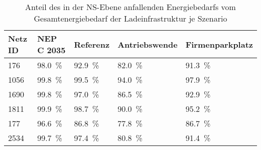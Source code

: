 {
\renewcommand{\arraystretch}{1.2}%
\begin{table}[H]
	\begin{center}
		\caption{Anteil des in der NS-Ebene anfallenden Energiebedarfs vom Gesamtenergiebedarf der Ladeinfrastruktur je Szenario}
		\begin{tabu} to \textwidth {X[0.5] X[1, r] X[1, r] X[1.2, r] X[1.2, r]}
			\toprule
			Netz ID    & NEP C \num{2035}    & Referenz            & Antriebswende       & \glqq Firmenparkplatz\grqq \\ \midrule
			\num{176}  & \SI{98.0}{\percent} & \SI{92.9}{\percent} & \SI{82.0}{\percent} & \SI{91.3}{\percent}        \\
			\num{1056} & \SI{99.8}{\percent} & \SI{99.5}{\percent} & \SI{94.0}{\percent} & \SI{97.9}{\percent}        \\
			\num{1690} & \SI{99.8}{\percent} & \SI{97.0}{\percent} & \SI{86.5}{\percent} & \SI{92.9}{\percent}        \\
			\num{1811} & \SI{99.9}{\percent} & \SI{98.7}{\percent} & \SI{90.0}{\percent} & \SI{95.2}{\percent}        \\
			\num{177}  & \SI{96.6}{\percent} & \SI{86.8}{\percent} & \SI{77.8}{\percent} & \SI{86.7}{\percent}        \\
			\num{2534} & \SI{99.7}{\percent} & \SI{97.4}{\percent} & \SI{80.8}{\percent} & \SI{91.4}{\percent}        \\ \bottomrule
		\end{tabu}
		\label{tab:lvConnectionShare}
	\end{center}
	\vspace{-3mm}%
\end{table}
}